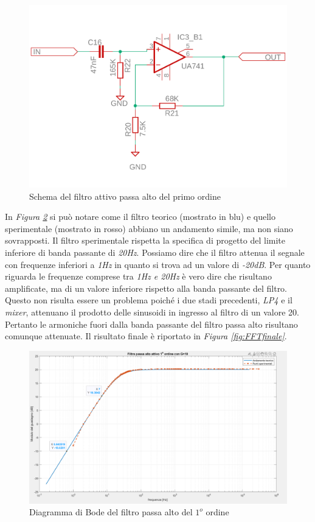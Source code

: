 \documentclass[titlepage]{report}
\begin{document}
	\begin{figure}[H]
		\centering
		\includegraphics[scale=0.5]{Immagini/sch_hp1.pdf}
		\caption{Schema del filtro attivo passa alto del primo ordine}
		\label{fig:sch_hp1}
	\end{figure}

	In \textit{Figura \ref{fig:BODEHp1Real}} si può notare come il filtro teorico (mostrato in blu) e quello sperimentale (mostrato in rosso) abbiano un andamento simile, ma non siano sovrapposti. Il filtro sperimentale rispetta la specifica di progetto del limite inferiore di banda passante di \textit{20Hz}. Possiamo dire che il filtro attenua il segnale con frequenze inferiori a \textit{1Hz} in quanto si trova ad un valore di \textit{-20dB}. Per quanto riguarda le frequenze comprese tra \textit{1Hz e 20Hz} è vero dire che risultano amplificate, ma di un valore inferiore rispetto alla banda passante del filtro. Questo non risulta essere un problema poiché i due stadi precedenti, \textit{LP4} e il \textit{mixer}, attenuano il prodotto delle sinusoidi in ingresso al filtro di un valore 20. Pertanto le armoniche fuori dalla banda passante del filtro passa alto risultano comunque attenuate. Il risultato finale è riportato in \textit{Figura \ref{fig:FFTfinale}}.

	\begin{figure}[H]
		\centering
		\includegraphics[scale=0.48]{Immagini/hpf1_filter_response.png}
		\caption{Diagramma di Bode del filtro passa alto del $1^o$ ordine}
		\label{fig:BODEHp1Real}
	\end{figure}
\end{document}
